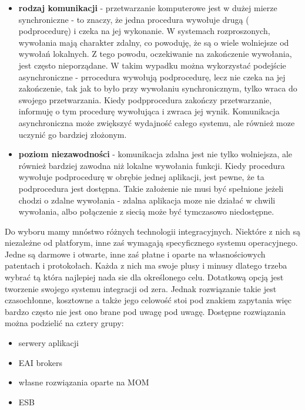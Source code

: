 \begin{itemize}
	\item \textbf{rodzaj komunikacji} - przetwarzanie komputerowe jest w dużej mierze synchroniczne - to znaczy, że jedna procedura wywołuje drugą ( podprocedurę) i czeka na jej wykonanie. W systemach rozproszonych, wywołania mają charakter zdalny, co powoduję, że są o wiele wolniejsze od wywołań lokalnych. Z tego powodu, oczekiwanie na zakończenie wywołania, jest często nieporządane. W takim wypadku można wykorzystać podejście asynchroniczne - prrocedura wywołują podprocedurę, lecz nie czeka na jej zakończenie, tak jak to było przy wywołaniu synchronicznym, tylko wraca do swojego przetwarzania. Kiedy podpprocedura zakończy przetwarzanie, informuję o tym procedurę wywołująca i zwraca jej wynik. Komunikacja asynchroniczna może zwiększyć wydajność całego systemu, ale również moze uczynić go bardziej złożonym.
	\item \textbf{poziom niezawodności} - komunikacja zdalna jest nie tylko wolniejsza, ale również bardziej zawodna niż lokalne wywołania funkcji. Kiedy procedura wywołuje podprocedurę w obrębie jednej aplikacji, jest pewne, że ta podprocedura jest dostępna. Takie założenie nie musi być spełnione jeżeli chodzi o zdalne wywołania - zdalna aplikacja moze nie działać w chwili wywołania, albo połączenie z siecią może być tymczasowo niedostępne.
\end{itemize}

Do wyboru mamy mnóstwo różnych technologii integracyjnych. Niektóre z nich są niezależne od platforym, inne zaś wymagają specyficznego systemu operacyjnego. Jedne są darmowe i otwarte, inne zaś płatne i oparte na własnościowych patentach i protokołach. Każda z nich ma swoje plusy i minusy dlatego trzeba wybrać tą która najlepiej nada sie dla określonego celu. Dotatkową opcją jest tworzenie swojego systemu integracji od zera. Jednak rozwiązanie takie jest czasochłonne, kosztowne a także jego celowość stoi pod znakiem zapytania więc bardzo często nie jest ono brane pod uwagę pod uwagę.
Dostępne rozwiązania można podzielić na cztery grupy: \cite{chappell2004}

\begin{itemize}
	\item serwery aplikacji
	\item EAI brokers
	\item własne rozwiązania oparte na  MOM
	\item ESB
\end{itemize}

